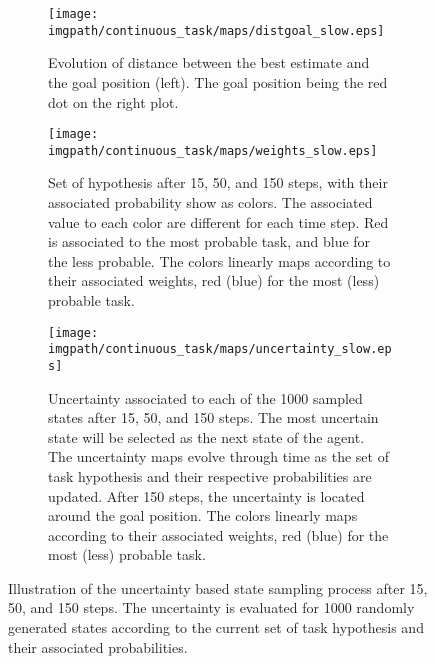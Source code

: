 \begin{figure}[!p]
\centering
    \begin{subfigure}[b]{\columnwidth}
        \centering
        \texttt{[image: \\imgpath/continuous\_task/maps/distgoal\_slow.eps]}
        \caption{Evolution of distance between the best estimate and the goal position (left). The goal position being the red dot on the right plot.}
        \label{fig:continuoustaskexampleslowdist}
    \end{subfigure}
    \begin{subfigure}[b]{\columnwidth}
        \centering
        \texttt{[image: \\imgpath/continuous\_task/maps/weights\_slow.eps]}
        \caption{Set of hypothesis after 15, 50, and 150 steps, with their associated probability show as colors. The associated value to each color are different for each time step. Red is associated to the most probable task, and blue for the less probable. The colors linearly maps according to their associated weights, red (blue) for the most (less) probable task.}
        \label{fig:continuoustaskexampleslowweights}
    \end{subfigure}
    \begin{subfigure}[b]{\columnwidth}
        \centering
        \texttt{[image: \\imgpath/continuous\_task/maps/uncertainty\_slow.eps]}
        \caption{Uncertainty associated to each of the 1000 sampled states after 15, 50, and 150 steps. The most uncertain state will be selected as the next state of the agent. The uncertainty maps evolve through time as the set of task hypothesis and their respective probabilities are updated. After 150 steps, the uncertainty is located around the goal position. The colors linearly maps according to their associated weights, red (blue) for the most (less) probable task.}
        \label{fig:continuoustaskexampleslowuncertainty}
    \end{subfigure}
\caption{Illustration of the uncertainty based state sampling process after 15, 50, and 150 steps. The uncertainty is evaluated for 1000 randomly generated states according to the current set of task hypothesis and their associated probabilities.}
\label{fig:continuoustasktasksamplingexampleslow}
\end{figure}



